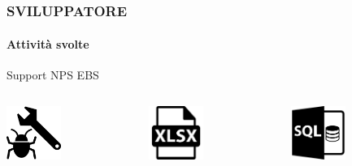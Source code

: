 \documentclass[hyperref={pdfpagemode=FullScreen},aspectratio=169]{beamer}
\begin{document}
\section{}
\begin{frame}
\frametitle{SVILUPPATORE}
\framesubtitle{Attività svolte}
\vspace{-10pt}
\begin{block}{\begin{center}Support NPS EBS\end{center}}
\begin{columns}[T] %
     
     \begin{column}[T]{5cm} %
     \begin{center}
     \includegraphics[height=50pt]{images/BugFix} 
     \end{center}     
     \end{column} 
     
     \begin{column}[T]{5cm} %
     \begin{center}
     \includegraphics[height=50pt]{images/Excel} 
     \end{center}     
     \end{column} 
     
      \begin{column}[T]{5cm} %
     \begin{center}
     \includegraphics[height=50pt]{images/DB} 
     \end{center}     
     \end{column} 
     
     \end{columns}
\end{block}
\end{frame}
\end{document}
